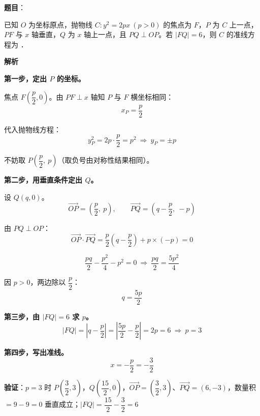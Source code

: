 \begin{answer}

\textbf{题目}：

已知 $O$ 为坐标原点，抛物线 $C:y^{2}=2px\ (p>0)$ 的焦点为 $F$，$P$ 为 $C$ 上一点，$PF$ 与 $x$ 轴垂直，$Q$ 为 $x$ 轴上一点，且 $PQ\perp OP$。若 $|FQ|=6$，则 $C$ 的准线方程为 \gkblank{}．

\textbf{解析}

\textbf{第一步，定出 $P$ 的坐标。}

焦点 $F\left(\dfrac p2,0\right)$。由 $PF\perp x$ 轴知 $P$ 与 $F$ 横坐标相同：
\nopagebreak[4]
\[x_P=\frac p2\]

代入抛物线方程：
\nopagebreak[4]
\[y_P^{2}=2p\cdot\frac p2=p^{2}\ \Longrightarrow\ y_P=\pm p\]

不妨取 $P\left(\dfrac p2,\ p\right)$（取负号由对称性结果相同）。

\textbf{第二步，用垂直条件定出 $Q$。}

设 $Q(q,0)$。
\nopagebreak[4]
\[\overrightarrow{OP}=\left(\frac p2,\ p\right),\qquad \overrightarrow{PQ}=\left(q-\frac p2,\ -p\right)\]

由 $PQ\perp OP$：
\nopagebreak[4]
\[\overrightarrow{OP}\cdot\overrightarrow{PQ}=\frac p2\left(q-\frac p2\right)+p\times(-p)=0\]

\nopagebreak[4]
\[\frac{pq}2-\frac{p^{2}}4-p^{2}=0\ \Longrightarrow\ \frac{pq}2=\frac{5p^{2}}4\]

因 $p>0$，两边除以 $\dfrac p2$：
\nopagebreak[4]
\[q=\frac{5p}2\]

\textbf{第三步，由 $|FQ|=6$ 求 $p$。}
\nopagebreak[4]
\[|FQ|=\left|q-\frac p2\right|=\left|\frac{5p}2-\frac p2\right|=2p=6\ \Longrightarrow\ p=3\]

\textbf{第四步，写出准线。}
\nopagebreak[4]
\[x=-\frac p2=-\frac32\]

\begin{gktip}
\textbf{验证}：$p=3$ 时 $P\left(\dfrac32,3\right)$，$Q\left(\dfrac{15}2,0\right)$，$\overrightarrow{OP}=\left(\dfrac32,3\right)$、$\overrightarrow{PQ}=(6,-3)$，数量积 $=9-9=0$  垂直成立；$|FQ|=\dfrac{15}2-\dfrac32=6$ 
\end{gktip}


\par\medskip

\end{answer}
